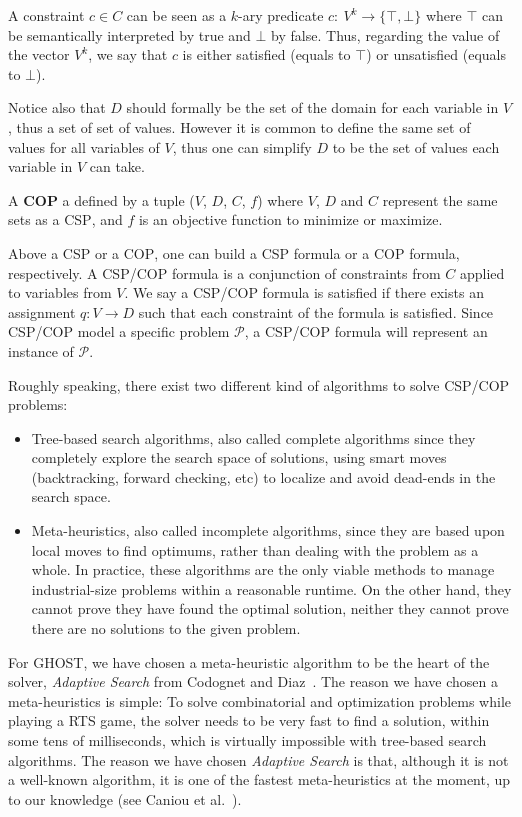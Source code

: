 \documentclass[journal]{IEEEtran}
\newcommand{\csp}{\textsc{CSP}\xspace}
\newcommand{\cop}{\textsc{COP}\xspace}
\newcommand{\ghost}{\textsc{GHOST}\xspace}
\begin{document}
A  constraint  $c   \in  C$  can  be  seen  as   a  $k$-ary  predicate
$c:~V^k\rightarrow\{\top,\bot\}$ where $\top$ can be semantically
interpreted by true and $\bot$ by  false. Thus, regarding the value of
the  vector $V^k$,  we say  that $c$  is either  satisfied (equals  to
$\top$) or unsatisfied (equals to $\bot$).

Notice also that $D$ should formally be the set of the domain for each
variable in $V$, thus a set of  set of values. However it is common to
define the same set  of values for all variables of  $V$, thus one can
simplify $D$ to be the set of values each variable in $V$ can take.

A {\bf \cop} a defined by a tuple ($V$, $D$, $C$, $f$) where $V$, $D$ and
$C$  represent the  same  sets as  a  \csp, and  $f$  is an  objective
function to minimize  or maximize.

Above  a \csp  or a  \cop, one  can  build a  \csp formula  or a  \cop
formula,  respectively.   A  \csp/\cop  formula is  a  conjunction  of
constraints from $C$ applied to variables from $V$. We say a \csp/\cop
formula is satisfied  if there exists an assignment  $q: V \rightarrow
D$  such that  each constraint  of  the formula  is satisfied.   Since
\csp/\cop model a specific  problem $\mathcal{P}$, a \csp/\cop formula
will represent an instance of $\mathcal{P}$.

Roughly  speaking, there  exist two  different kind  of algorithms  to
solve \csp/\cop problems: 
\begin{itemize}
\item Tree-based  search algorithms,  also called  complete algorithms
  since they completely  explore the search space  of solutions, using
  smart moves  (backtracking, forward  checking, etc) to  localize and
  avoid dead-ends in the search space.
\item Meta-heuristics,  also called incomplete algorithms,  since they
  are based  upon local  moves to find  optimums, rather  than dealing
  with the problem  as a whole. In practice, these  algorithms are the
  only  viable methods  to  manage industrial-size  problems within  a
  reasonable runtime. On  the other hand, they cannot  prove they have
  found the optimal  solution, neither they cannot prove  there are no
  solutions to the given problem.
\end{itemize}

For \ghost, we have chosen a  meta-heuristic algorithm to be the heart
of   the   solver,   {\it   Adaptive   Search}   from   Codognet   and
Diaz~\cite{Codognet01}. The reason we have chosen a meta-heuristics is
simple: To solve combinatorial and optimization problems while playing
a RTS  game, the  solver needs  to be  very fast  to find  a solution,
within some tens  of milliseconds, which is  virtually impossible with
tree-based search algorithms. The reason we have chosen {\it Adaptive
Search} is that,  although it is not a well-known  algorithm, it is one
of the fastest meta-heuristics at the moment, up to our knowledge (see
Caniou et al.~\cite{Caniou14}).
\end{document}
